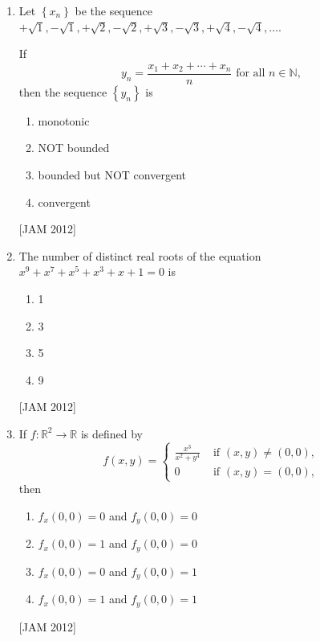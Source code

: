 \begin{enumerate}
  

\item  Let $\left\{x_{n}\right\}$ be the sequence $+\sqrt{1},-\sqrt{1},+\sqrt{2},-\sqrt{2},+\sqrt{3},-\sqrt{3},+\sqrt{4},-\sqrt{4}, \ldots$.

If
$$
y_{n}=\frac{x_{1}+x_{2}+\cdots+x_{n}}{n} \text { for all } n \in \mathbb{N},
$$
then the sequence $\left\{y_{n}\right\}$ is


\begin{enumerate}
    \item monotonic 
\item NOT bounded 
\item bounded but NOT convergent 
\item convergent
\end{enumerate}
\hfill [JAM 2012]





\item  The number of distinct real roots of the equation $x^{9}+x^{7}+x^{5}+x^{3}+x+1=0$ is 


\begin{enumerate}
    
\item 1 
\item 3 
\item 5 
\item 9
\end{enumerate}
\hfill [JAM 2012]




\item  If $f: \mathbb{R}^{2} \rightarrow \mathbb{R}$ is defined by
$$
f(x, y)=\left\{\begin{array}{cc}
\frac{x^{3}}{x^{2}+y^{4}} & \text { if }(x, y) \neq(0,0),  \\
0 & \text { if }(x, y)=(0,0),
\end{array}\right.
$$
then


\begin{enumerate}
   \item $f_{x}(0,0)=0$ and $f_{y}(0,0)=0$ 
\item $f_{x}(0,0)=1$ and $f_{y}(0,0)=0$ 
\item $f_{x}(0,0)=0$ and $f_{y}(0,0)=1$ 
\item $f_{x}(0,0)=1$ and $f_{y}(0,0)=1$ 
\end{enumerate}
\hfill [JAM 2012]






\end{enumerate}
